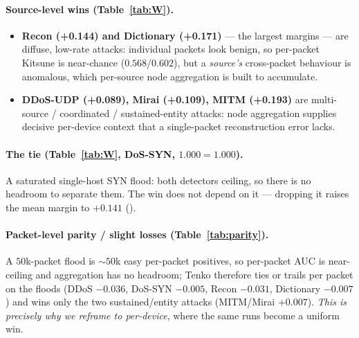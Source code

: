 \documentclass[11pt]{article}
\begin{document}
\paragraph{Source-level wins (Table~\ref{tab:W}).}
\begin{itemize}
  \item \textbf{Recon (+0.144) and Dictionary (+0.171)} --- the largest margins --- are diffuse,
        low-rate attacks: individual packets look benign, so per-packet Kitsune is near-chance
        ($0.568$/$0.602$), but a \emph{source's} cross-packet behaviour is anomalous, which
        per-source node aggregation is built to accumulate.
  \item \textbf{DDoS-UDP (+0.089), Mirai (+0.109), MITM (+0.193)} are multi-source / coordinated /
        sustained-entity attacks: node aggregation supplies decisive per-device context that a
        single-packet reconstruction error lacks.
\end{itemize}

\paragraph{The tie (Table~\ref{tab:W}, DoS-SYN, $1.000=1.000$).} A saturated single-host SYN flood:
both detectors ceiling, so there is no headroom to separate them. The win does not depend on it ---
dropping it raises the mean margin to $+0.141$ ().

\paragraph{Packet-level parity / slight losses (Table~\ref{tab:parity}).} A $50$k-packet flood is
$\sim$$50$k easy per-packet positives, so per-packet AUC is near-ceiling and aggregation has no
headroom; Tenko therefore ties or trails per packet on the floods (DDoS $-0.036$, DoS-SYN $-0.005$,
Recon $-0.031$, Dictionary $-0.007$) and wins only the two sustained/entity attacks (MITM/Mirai
$+0.007$). \emph{This is precisely why we reframe to per-device}, where the same runs become a
uniform win.
\end{document}
